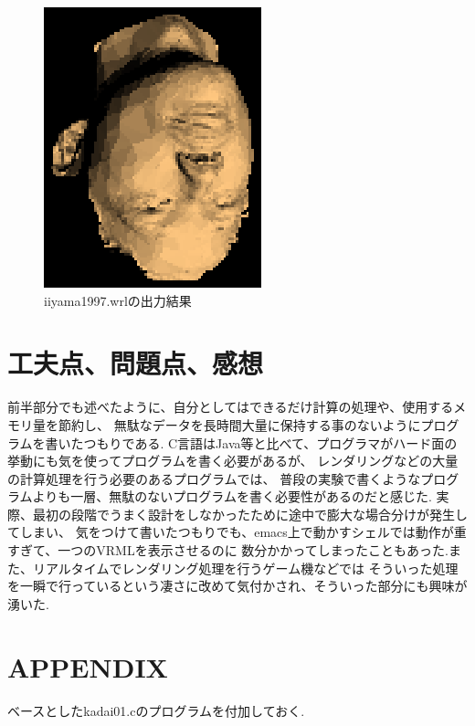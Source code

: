 \documentclass[a4j,dvipdfmx]{jsarticle}
\begin{document}
\begin{figure}[hp]
  \begin{center}
    \includegraphics[clip,scale=0.5]{images/Kadai02ForIiyama1997.eps}
    \caption{iiyama1997.wrlの出力結果}
    \label{1997}
  \end{center}
\end{figure}

\section{工夫点、問題点、感想}
前半部分でも述べたように、自分としてはできるだけ計算の処理や、使用するメモリ量を節約し、
無駄なデータを長時間大量に保持する事のないようにプログラムを書いたつもりである.
C言語はJava等と比べて、プログラマがハード面の挙動にも気を使ってプログラムを書く必要があるが、
レンダリングなどの大量の計算処理を行う必要のあるプログラムでは、
普段の実験で書くようなプログラムよりも一層、無駄のないプログラムを書く必要性があるのだと感じた.
実際、最初の段階でうまく設計をしなかったために途中で膨大な場合分けが発生してしまい、
気をつけて書いたつもりでも、emacs上で動かすシェルでは動作が重すぎて、一つのVRMLを表示させるのに
数分かかってしまったこともあった.また、リアルタイムでレンダリング処理を行うゲーム機などでは
そういった処理を一瞬で行っているという凄さに改めて気付かされ、そういった部分にも興味が湧いた.


\section{APPENDIX}
ベースとしたkadai01.cのプログラムを付加しておく.

\end{document}
